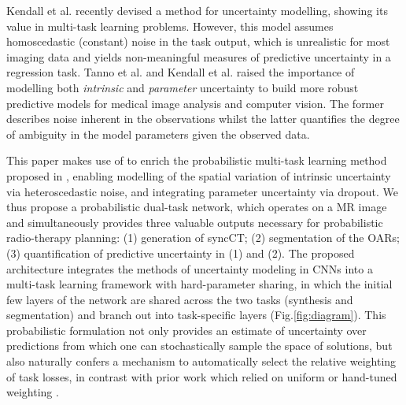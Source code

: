 Kendall et al.\cite{kendall2017multi} recently devised a method for uncertainty modelling, showing its value in multi-task learning problems. However, this model assumes homoscedastic (constant) noise in the task output, which is unrealistic for most imaging data and yields non-meaningful measures of predictive uncertainty in a regression task. Tanno et al. \cite{tanno2017bayesian} and Kendall et al. \cite{kendall2017uncertainties} raised the importance of modelling both \textit{intrinsic} and \textit{parameter} uncertainty to build more robust predictive models for medical image analysis and computer vision. The former describes noise inherent in the observations whilst the latter quantifies the degree of ambiguity in the model parameters given the observed data. 

This paper makes use of \cite{tanno2017bayesian} to enrich the probabilistic multi-task learning method proposed in \cite{kendall2017multi}, enabling modelling of the spatial variation of intrinsic uncertainty via heteroscedastic noise, and integrating parameter uncertainty via dropout. We thus propose a probabilistic dual-task network, which operates on a MR image and simultaneously provides three valuable outputs necessary for probabilistic radio-therapy planning: (1) generation of syncCT; (2) segmentation of the OARs; (3) quantification of predictive uncertainty in (1) and (2). The proposed architecture integrates the methods of uncertainty modeling in CNNs \cite{tanno2017bayesian,kendall2017uncertainties} into a multi-task learning framework with hard-parameter sharing, in which the initial few layers of the network are shared across the two tasks (synthesis and segmentation) and branch out into task-specific layers (Fig.\ref{fig:diagram}). This probabilistic formulation not only provides an estimate of uncertainty over predictions from which one can stochastically sample the space of solutions, but also naturally confers a mechanism to automatically select the relative weighting of task losses, in contrast with prior work which relied on uniform or hand-tuned weighting \cite{moeskops2016deep}.  

